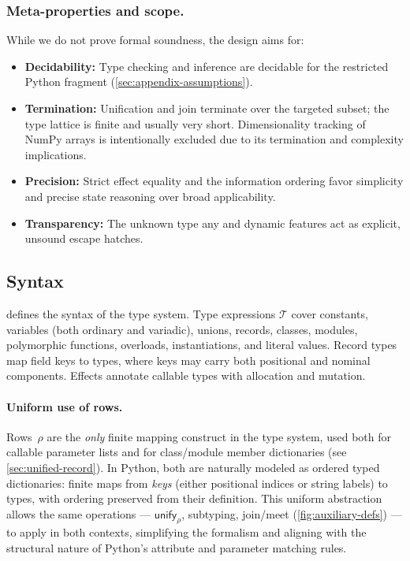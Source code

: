 \subsubsection*{Meta-properties and scope.}
While we do not prove formal soundness, the design aims for:
\begin{itemize}
  \item \textbf{Decidability:} Type checking and inference are decidable for the restricted Python fragment (\cref{sec:appendix-assumptions}).
  \item \textbf{Termination:} Unification and join terminate over the targeted subset; the type lattice is finite and usually very short. Dimensionality tracking of NumPy arrays is intentionally excluded due to its termination and complexity implications.
  \item \textbf{Precision:} Strict effect equality and the information ordering favor simplicity and precise state reasoning over broad applicability.
  \item \textbf{Transparency:} The unknown type \textsf{any} and dynamic features act as explicit, unsound escape hatches.
\end{itemize}

\subsection{Syntax}
 defines the syntax of the type system. Type expressions $\mathcal{T}$ cover constants, variables (both ordinary and variadic), unions, records, classes, modules, polymorphic functions, overloads, instantiations, and literal values.  
Record types map field keys to types, where keys may carry both positional and nominal components.  
Effects annotate callable types with allocation and mutation.

\paragraph{Uniform use of rows.}
Rows~$\rho$ are the \emph{only} finite mapping construct in the type system, used both for
callable parameter lists and for class/module member dictionaries (see \cref{sec:unified-record}).  
In Python, both are naturally modeled as ordered typed dictionaries: finite maps from
\emph{keys} (either positional indices or string labels) to types, with ordering
preserved from their definition.  
This uniform abstraction allows the same operations --- $\mathsf{unify}_{\rho}$, subtyping, join/meet (\cref{fig:auxiliary-defs}) --- to apply in both contexts,  
simplifying the formalism and aligning with the structural nature of Python's
attribute and parameter matching rules.

